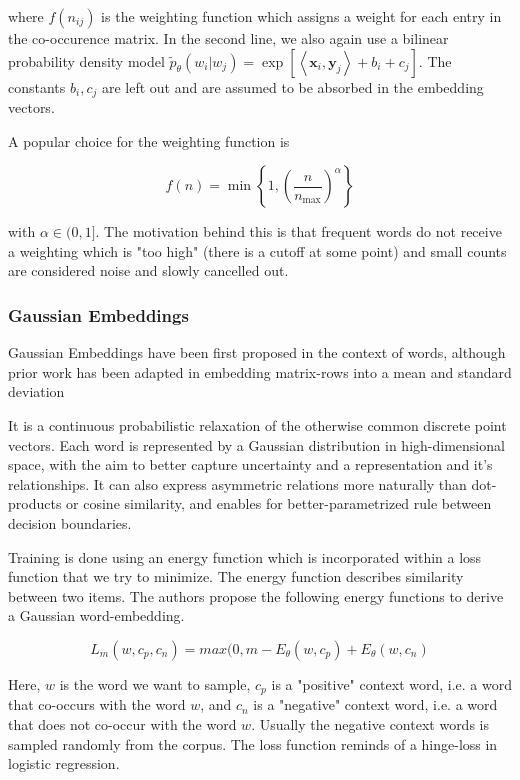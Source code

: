 \documentclass[a4paper,12pt,twoside,openright]{report}
\begin{document}
where $f(n_{ij})$ is the weighting function which assigns a weight for each entry in the co-occurence matrix. 
In the second line, we also again use a bilinear probability density model $\tilde{p}_{\theta}\left(w_{i} | w_{j}\right)=\exp \left[\left\langle\mathbf{x}_{i}, \mathbf{y}_{j}\right\rangle+b_{i}+c_{j}\right]$.
The constants $b_i, c_j$ are left out and are assumed to be absorbed in the embedding vectors.

A popular choice for the weighting function is 

$$
f(n) = \min \left\lbrace 1, \left(\frac{n}{n_{\max}}\right)^{\alpha} \right\rbrace
$$

with $\alpha \in (0, 1]$.
The motivation behind this is that frequent words do not receive a weighting which is "too high" (there is a cutoff at some point) and small counts are considered noise and slowly cancelled out.


\subsubsection{Gaussian Embeddings}

Gaussian Embeddings have been first proposed in the context of words, although prior work has been adapted in embedding matrix-rows into a mean and standard deviation \cite{vilnis14} 

It is a continuous probabilistic relaxation of the otherwise common discrete point vectors.
Each word is represented by a Gaussian distribution in high-dimensional space, with the aim to better capture uncertainty and a representation and it's relationships.
It can also express asymmetric relations more naturally than dot-products or cosine similarity, and enables for better-parametrized rule between decision boundaries.

Training is done using an energy function which is incorporated within a loss function that we try to minimize. 
The energy function describes similarity between two items.
The authors propose the following energy functions to derive a Gaussian word-embedding.

\begin{equation}
L_m(w, c_p, c_n) = max(0, m - E_\theta(w, c_p) + E_\theta(w, c_n)
\end{equation}

Here, $w$ is the word we want to sample, $c_p$ is a "positive" context word, i.e. a word that co-occurs with the word $w$, and $c_n$ is a "negative" context word, i.e. a word that does not co-occur with the word $w$.
Usually the negative context words is sampled randomly from the corpus.
The loss function reminds of a hinge-loss in logistic regression.
\end{document}
